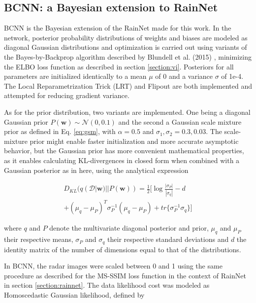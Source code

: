 \subsection{BCNN: a Bayesian extension to RainNet}


BCNN is the Bayesian extension of the RainNet made for this work. In the network, posterior probability distributions of weights and biases are modeled as diagonal Gaussian distributions and optimization is carried out using variants of the Bayes-by-Backprop algorithm described by Blundell et al. (2015) \cite{blundell_weight_2015}, minimizing the ELBO loss function as described in section \ref{section:vi}. Posteriors for all parameters are initialized identically to a mean $\mu$ of 0 and a variance $\sigma$ of 1e-4. The Local Reparametrization Trick (LRT) \cite{kingma_variational_2015} and Flipout \cite{wen_flipout_2018} are both implemented and attempted for reducing gradient variance. 

As for the prior distribution, two variants are implemented. One being a diagonal Gaussian prior $P(\pmb{w}) \sim \mathcal{N}(0,0.1)$ and the second a Gaussian scale mixture prior as defined in Eq. \ref{eq:gsm}, with $\alpha = 0.5$ and $\sigma_1, \sigma_2 = 0.3, 0.03$. The scale-mixture prior might enable faster initialization and more accurate asymptotic behavior, but the Gaussian prior has more convenient mathematical properties, as it enables calculating KL-divergences in closed form when combined with a Gaussian posterior as in here, using the analytical expression

\begin{equation}
\begin{split}
D_{KL}(q(\mathcal{D}|\pmb{w}) || P(\pmb{w})) =
\frac{1}{2}[\log \frac{|\sigma_P|}{|\sigma_q|}
- d \\
+ (\mu_q - \mu_P)^T \sigma_P^{-1}(\mu_q - \mu_P)
+ tr\{\sigma_P^{-1}\sigma_q\}
]
\end{split}
\end{equation}

where $q$ and $P$ denote the multivariate diagonal posterior and prior, $\mu_q$ and $\mu_P$ their respective means, $\sigma_P$ and $\sigma_q$ their respective standard deviations and  $d$ the identity matrix of the number of dimensions equal to that of the distributions. 

In BCNN, the radar images were scaled between 0 and 1 using the same procedure as described for the MS-SSIM loss function in the context of RainNet in section \ref{section:rainnet}. The data likelihood cost was modeled as Homoscedastic Gaussian likelihood, defined by 

